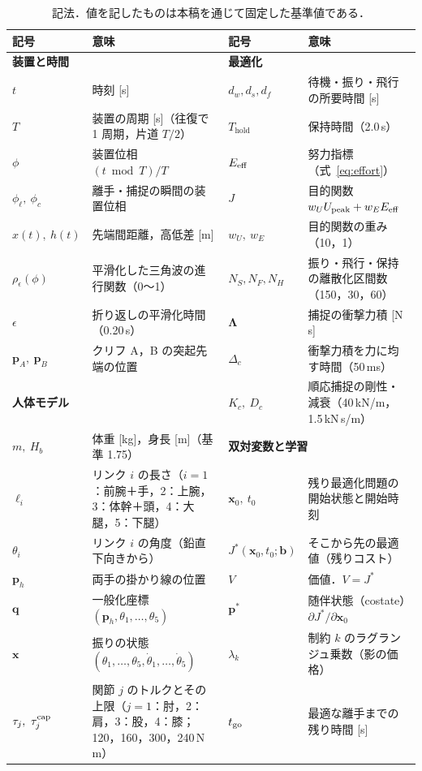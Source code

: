 \begin{table}[t]
\centering\scriptsize
\caption{記法．値を記したものは本稿を通じて固定した基準値である．}
\label{tab:notation}
\begin{tabular}{lp{}|lp{}}
\toprule
記号 & 意味 & 記号 & 意味 \\
\midrule
\multicolumn{2}{l|}{\textbf{装置と時間}} & \multicolumn{2}{l}{\textbf{最適化}} \\
$t$ & 時刻 [s] & $d_w,d_s,d_f$ & 待機・振り・飛行の所要時間 [s] \\
$T$ & 装置の周期 [s]（往復で 1 周期，片道 $T/2$） & $T_{\mathrm{hold}}$ & 保持時間（2.0\,s） \\
$\phi$ & 装置位相 $(t \bmod T)/T$ & $E_{\mathrm{eff}}$ & 努力指標（式~\eqref{eq:effort}） \\
$\phi_\ell,\ \phi_c$ & 離手・捕捉の瞬間の装置位相 & $J$ & 目的関数 $w_UU_{\mathrm{peak}}+w_EE_{\mathrm{eff}}$ \\
$x(t),\ h(t)$ & 先端間距離，高低差 [m] & $w_U,\ w_E$ & 目的関数の重み（10，1） \\
$\rho_\epsilon(\phi)$ & 平滑化した三角波の進行関数（0〜1） & $N_S,N_F,N_H$ & 振り・飛行・保持の離散化区間数（150，30，60） \\
$\epsilon$ & 折り返しの平滑化時間（0.20\,s） & $\bm\Lambda$ & 捕捉の衝撃力積 [N\,s] \\
$\bm p_A,\ \bm p_B$ & クリフ A，B の突起先端の位置 & $\Delta_c$ & 衝撃力積を力に均す時間（50\,ms） \\
\multicolumn{2}{l|}{\textbf{人体モデル}} & $K_c,\ D_c$ & 順応捕捉の剛性・減衰（40\,kN/m，1.5\,kN\,s/m） \\
$m,\ H_b$ & 体重 [kg]，身長 [m]（基準 1.75） & \multicolumn{2}{l}{\textbf{双対変数と学習}} \\
$\ell_i$ & リンク $i$ の長さ（$i=1$：前腕＋手，2：上腕，3：体幹＋頭，4：大腿，5：下腿） & $\bm x_0,\ t_0$ & 残り最適化問題の開始状態と開始時刻 \\
$\theta_i$ & リンク $i$ の角度（鉛直下向きから） & $J^*(\bm x_0,t_0;\bm b)$ & そこから先の最適値（残りコスト） \\
$\bm p_h$ & 両手の掛かり線の位置 & $V$ & 価値．$V=J^*$ \\
$\bm q$ & 一般化座標 $(\bm p_h,\theta_1,\dots,\theta_5)$ & $\bm p^*$ & 随伴状態（costate）$\partial J^*/\partial\bm x_0$ \\
$\bm x$ & 振りの状態 $(\theta_1,\dots,\theta_5,\dot\theta_1,\dots,\dot\theta_5)$ & $\lambda_k$ & 制約 $k$ のラグランジュ乗数（影の価格） \\
$\tau_j,\ \taucap_j$ & 関節 $j$ のトルクとその上限（$j=1$：肘，2：肩，3：股，4：膝；120，160，300，240\,N\,m） & $t_{\mathrm{go}}$ & 最適な離手までの残り時間 [s] \\

\end{tabular}
\end{table}
